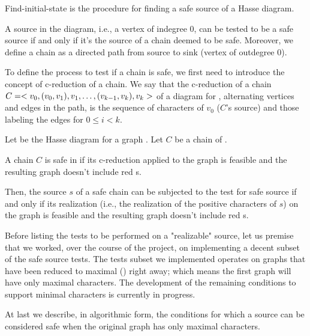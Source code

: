 Find-initial-state is the procedure for finding a safe source of a Hasse diagram.

A source in the diagram, i.e., a vertex of indegree 0, can be tested to be a safe source if and only if it's the source of a chain deemed to be safe.
Moreover, we define a chain as a directed path from source to sink (vertex of outdegree 0).

To define the process to test if a chain is safe, we first need to introduce the concept of c-reduction of a chain.
We say that the c-reduction of a chain $C = < v_{0}, (v_{0}, v_{1}), v_{1}, \dots, (v_{k-1}, v_{k}), v_{k} >$ of a diagram \hasse{} for \gm{}, alternating vertices and edges in the path, is the sequence of characters of $v_{0}$ ($C$'s source) and those labeling the edges  for $0 \leq i < k$.

\begin{definition}\label{definition:safe-chain}
  Let \hasse{} be the Hasse diagram for a graph \gm{}.
  Let $C$ be a chain of \hasse{}.

  A chain $C$ is safe in \hasse{} if its c-reduction applied to the graph \gm{} is feasible and the resulting graph doesn't include red \sg{}s.
\end{definition}

Then, the source $s$ of a safe chain can be subjected to the test for safe source if and only if its realization (i.e., the realization of the positive characters of $s$) on the graph \grb{} is feasible and the resulting graph doesn't include red \sg{}s.

Before listing the tests to be performed on a "realizable" source, let us premise that we worked, over the course of the project, on implementing a decent subset of the safe source tests.
The tests subset we implemented operates on graphs that have been reduced to maximal (\grbcm{}) right away; which means the first graph \grb{} will have only maximal characters.
The development of the remaining conditions to support minimal characters is currently in progress.

At last we describe, in algorithmic form, the conditions for which a source can be considered safe when the original graph \grb{} has only maximal characters.

